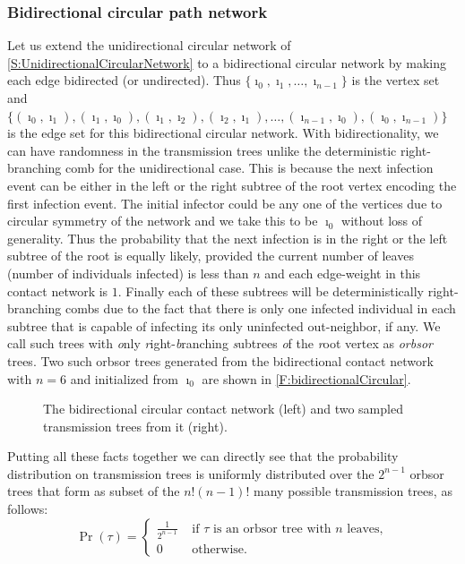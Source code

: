 \documentclass[review]{elsarticle}
\numberwithin{equation}{section}
\let\orgautoref\autoref
\renewcommand{\autoref}
        {\def\equationautorefname{Eq.}%
         \def\figureautorefname{Fig.}%
         \def\subfigureautorefname{Fig.}%
         \def\sectionautorefname{Sect.}%
         \def\subsectionautorefname{Sect.}%
         \def\subsubsectionautorefname{Sect.}%
         \def\Itemautorefname{item}%
         \def\tableautorefname{Table}%
         \def\propositionautorefname{Prop.}%
         \def\corollaryautorefname{Corollary}%
         \def\theoremautorefname{Theorem}%
         \def\remarkautorefname{Remark}%
         \def\lemmaautorefname{Lemma}%
         \def\proofofautorefname{Proof}%
         \def\exampleautorefname{Example}%
         \orgautoref}
\begin{document}
\subsubsection{Bidirectional circular path network}
Let us extend the unidirectional circular network of \autoref{S:UnidirectionalCircularNetwork} to a bidirectional circular network by making each edge bidirected (or undirected).  
Thus $\{\imath_0,\imath_1,\ldots,\imath_{n-1}\}$ is the vertex set and 
$\{(\imath_0,\imath_1), (\imath_1,\imath_0), (\imath_1,\imath_2), (\imath_2,\imath_1), \ldots, (\imath_{n-1},\imath_{0}), (\imath_{0},\imath_{n-1})\}$ 
is the edge set for this bidirectional circular network.
With bidirectionality, we can have randomness in the transmission trees unlike the deterministic right-branching comb for the unidirectional case.  
This is because the next infection event can be either in the left or the right subtree of the root vertex encoding the first infection event.  
The initial infector could be any one of the vertices due to circular symmetry of the network and we take this to be $\imath_0$ without loss of generality.  
Thus the probability that the next infection is in the right or the left subtree of the root is equally likely, provided the current number of leaves (number of individuals infected) is less than $n$ and each edge-weight in this contact network is $1$.  
Finally each of these subtrees will be deterministically right-branching combs due to the fact that there is only one infected individual in each subtree that is capable of infecting its only uninfected out-neighbor, if any.  
We call such trees with {\em o}nly {\em r}ight-{\em b}ranching {\em s}ubtrees {\em o}f the {\em r}oot vertex as {\em orbsor} trees.  
Two such orbsor trees generated from the bidirectional contact network with $n=6$ and initialized from $\imath_0$ are shown in \autoref{F:bidirectionalCircular}. 

\begin{figure}[htbp]
\begin{center}
{\scalebox{0.95}{
%

}}
\end{center}
\caption{The bidirectional circular contact network (left) and two sampled transmission trees from it (right).\label{F:bidirectionalCircular}}
\end{figure}

Putting all these facts together we can directly see that the probability distribution on transmission trees is uniformly distributed over the $2^{n-1}$ orbsor trees that form as subset of the $n!(n-1)!$ many possible transmission trees, as follows:
\begin{equation}\label{E:orbsorTransmissionTreeProb}
\Pr(\tau) = 
\begin{cases}
\frac{1}{2^{n-1}} & \text{ if $\tau$ is an orbsor tree with $n$ leaves},\\
0 & \text{ otherwise.}
\end{cases}
\end{equation}
\end{document}
